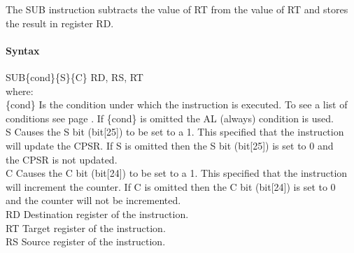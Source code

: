 \documentclass[12pt]{article}
\begin{document}
    \noindent
    The SUB instruction subtracts the value of RT from the value of RT and stores the result in register RD. 
    
    \paragraph{Syntax}
    \begin{flushleft}
    SUB\{cond\}\{S\}\{C\} RD, RS, RT\\
    \vspace{1em}        %
    where:\\
    \vspace{1em}
    \{cond\}    \hspace{2em} Is the condition under which the instruction is executed. To see a list of\\
                \hspace{5.4em} conditions see page . If \{cond\} is omitted the AL (always) condition is used.\\
    \vspace{1em}    
    S       \hspace{4.5em} Causes the S bit (bit[25]) to be set to a 1. This specified that the instruction\\
            \hspace{5.4em} will update the CPSR. If S is omitted then the S bit (bit[25]) is set to 0 and\\
            \hspace{5.4em} the CPSR is not updated.\\
    \vspace{1em}    
    C       \hspace{4.5em} Causes the C bit (bit[24]) to be set to a 1. This specified that the instruction\\
            \hspace{5.4em} will increment the counter. If C is omitted then the C bit (bit[24]) is set to 0\\
            \hspace{5.4em} and the counter will not be incremented.\\
    \vspace{1em}
    RD  \hspace{3.6em} Destination register of the instruction.\\
    \vspace{1em}
    RT  \hspace{3.7em} Target register of the instruction.\\
    \vspace{1em}
    RS  \hspace{3.85em} Source register of the instruction.\\
    \end{flushleft}
    
\end{document}
